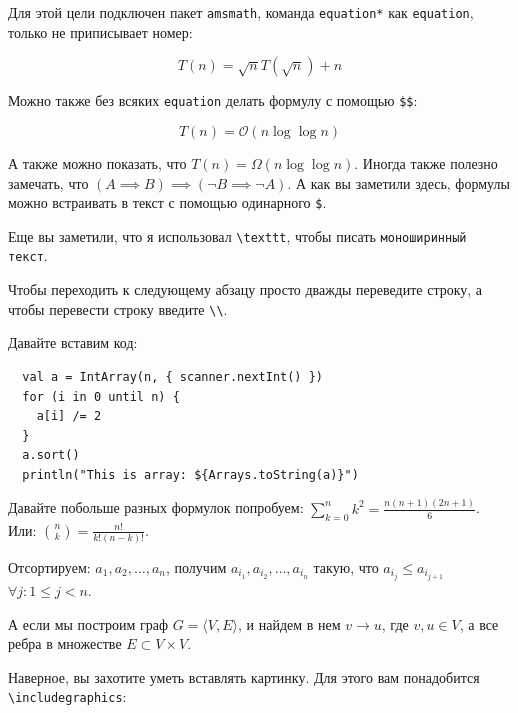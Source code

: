 \documentclass{article}
\begin{document}
Для этой цели подключен пакет \texttt{amsmath}, команда \texttt{equation*} как \texttt{equation}, только не приписывает номер:

\begin{equation*}
  T(n) = \sqrt{n} T(\sqrt{n}) + n
\end{equation*}

Можно также без всяких \texttt{equation} делать формулу с помощью \texttt{\$\$}:

$$ T(n) = \mathcal{O}(n \log{\log{n}}) $$ 

А также можно показать, что $T(n) = \Omega(n \log{\log{n}})$. Иногда также полезно замечать, что $(A \implies B) \implies (\neg{B} \implies \neg{A})$. А как вы заметили здесь, формулы можно встраивать в текст с помощью одинарного \texttt{\$}.

Еще вы заметили, что я использовал \texttt{\textbackslash{}texttt}, чтобы писать \texttt{моноширинный текст}.

Чтобы переходить к следующему абзацу просто дважды переведите строку, а чтобы перевести строку введите \texttt{\textbackslash{}\textbackslash{}}.

Давайте вставим код:
\begin{verbatim}
  val a = IntArray(n, { scanner.nextInt() })
  for (i in 0 until n) {
    a[i] /= 2
  }
  a.sort()
  println("This is array: ${Arrays.toString(a)}")
\end{verbatim}


Давайте побольше разных формулок попробуем: $\sum\limits_{k=0}^n k^2 = \frac{n(n+1)(2n+1)}{6}$. Или: ${n \choose k} = \frac{n!}{k!(n-k)!}$. 

Отсортируем: $a_1, a_2, \ldots, a_n$, получим $a_{i_1}, a_{i_2}, \ldots, a_{i_n}$ такую, что $a_{i_j} \le a_{i_{j+1}}$ $\forall j: 1 \le j < n$. 

А если мы построим граф $G = \langle V, E \rangle$, и найдем в нем $v \to u$, где $v, u \in V$, а все ребра в множестве $E \subset V \times V$.

Наверное, вы захотите уметь вставлять картинку. Для этого вам понадобится \texttt{\textbackslash{}includegraphics}:
\end{document}
